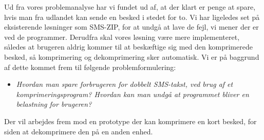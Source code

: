 Ud fra vores problemanalyse har vi fundet ud af, at der klart er penge at spare, hvis man fra udlandet kan sende en besked i stedet for to. Vi har ligeledes set på eksisterende løsninger som SMS-ZIP, for at undgå at lave de fejl, vi mener der er ved de programmer. Derudfra skal vores løsning være mere implementeret, således at brugeren aldrig kommer til at beskæftige sig med den komprimerede besked, så komprimering og dekomprimering sker automatisk. Vi er på baggrund af dette kommet frem til følgende problemformulering:

\begin{itemize}
\item[] \emph{Hvordan man spare forbrugeren for dobbelt SMS-takst, ved brug af et komprimeringsprogram? Hvordan kan man undgå at programmet bliver en belastning for brugeren?}
\end{itemize}

Der vil arbejdes frem mod en prototype der kan komprimere en kort besked, for siden at dekomprimere den på en anden enhed. 